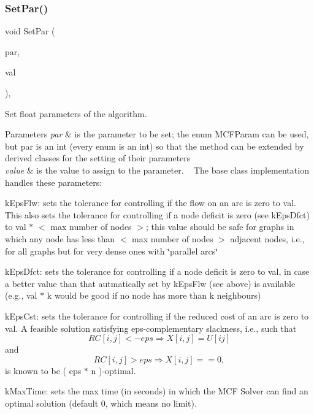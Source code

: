 \mbox{\label{class_m_c_f_class_a4acd81f913880873c577de03a4fa1959}} 
\subsubsection{\texorpdfstring{Set\+Par()}{SetPar()}\hspace{0.1cm}{\footnotesize\ttfamily [2/2]}}
{\footnotesize\ttfamily void Set\+Par (\begin{DoxyParamCaption}\item[{int}]{par,  }\item[{double}]{val }\end{DoxyParamCaption})\hspace{0.3cm}{\ttfamily [inline]}, {\ttfamily [virtual]}}

Set float parameters of the algorithm.


\begin{DoxyParams}{Parameters}
{\em par} & is the parameter to be set; the enum M\+C\+F\+Param can be used, but \textquotesingle{}par\textquotesingle{} is an int (every enum is an int) so that the method can be extended by derived classes for the setting of their parameters\\
\hline
{\em value} & is the value to assign to the parameter. ~\newline
 The base class implementation handles these parameters\+:\\
\hline
\end{DoxyParams}

\begin{DoxyItemize}
\item k\+Eps\+Flw\+: sets the tolerance for controlling if the flow on an arc is zero to val. This also sets the tolerance for controlling if a node deficit is zero (see k\+Eps\+Dfct) to val $\ast$ $<$ max number of nodes $>$; this value should be safe for graphs in which any node has less than $<$ max number of nodes $>$ adjacent nodes, i.\+e., for all graphs but for very dense ones with \char`\"{}parallel arcs\char`\"{}
\item k\+Eps\+Dfct\+: sets the tolerance for controlling if a node deficit is zero to val, in case a better value than that autmatically set by k\+Eps\+Flw (see above) is available (e.\+g., val $\ast$ k would be good if no node has more than k neighbours)
\item k\+Eps\+Cst\+: sets the tolerance for controlling if the reduced cost of an arc is zero to val. A feasible solution satisfying eps-\/complementary slackness, i.\+e., such that \[ RC[ i , j ] < - eps \Rightarrow X[ i , j ] = U[ ij ] \] and \[ RC[ i , j ] > eps \Rightarrow X[ i , j ] == 0 , \] is known to be ( eps $\ast$ n )-\/optimal.
\item k\+Max\+Time\+: sets the max time (in seconds) in which the M\+CF Solver can find an optimal solution (default 0, which means no limit). 
\end{DoxyItemize}


